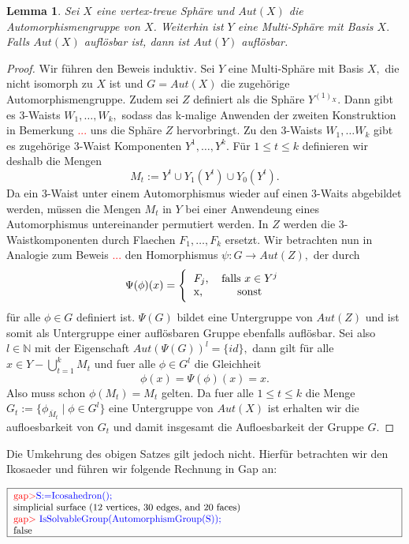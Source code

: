 \documentclass[12pt,titlepage,twoside,cleardoublepage]{article}
\theoremstyle{nummermitklammern}
\newtheorem{lemma}[temp]{Lemma}
\newtheorem{lemma}[zahl]{Lemma}
\numberwithin{equation}{section}
\begin{document}
\begin{lemma}
 Sei $X$ eine vertex-treue Sphäre und $Aut(X)$ die Automorphismengruppe von $X$. Weiterhin ist $Y$ eine Multi-Sphäre mit Basis $X.$ Falls $Aut(X)$ auflösbar ist, dann ist $Aut(Y)$ auflösbar.
\end{lemma}
\begin{proof}
Wir führen den Beweis induktiv. Sei $Y$ eine Multi-Sphäre mit Basis $X,$ die nicht isomorph zu $X$ ist und $G=Aut(X)$ die zugehörige Automorphismengruppe. Zudem sei $Z$ definiert als die Sphäre $Y^{(1)_X}.$ Dann gibt es 3-Waists $W_1,\ldots,W_k,$ sodass das k-malige Anwenden der zweiten Konstruktion in Bemerkung \textcolor{red}{...} uns die Sphäre $Z$ hervorbringt. Zu den 3-Waists $W_1,\ldots W_k$ gibt es zugehörige 3-Waist Komponenten $Y^1,\ldots,Y^k.$  Für $1\leq t\leq k$ definieren wir deshalb die Mengen 
\[
M_t:=Y^t\cup Y_1(Y^t)\cup Y_0(Y^t).
\] Da ein 3-Waist unter einem Automorphismus wieder auf einen 3-Waits abgebildet werden, müssen die Mengen $M_t$ in $Y$ bei einer Anwendeung eines Automorphismus untereinander permutiert werden. In $Z$ werden die 3-Waistkomponenten durch Flaechen $F_1,\ldots,F_k$ ersetzt.
Wir betrachten nun in Analogie zum Beweis \textcolor{red}{...} den Homorphismus $\psi:G\to Aut(Z),$ der durch
\[
\Psi(\phi)(x)=\Biggl\{
\begin{tabular}[l]{lcr}
$F_j$,&\textcolor{black}{ falls  $x\in Y^j$} \\
x,& sonst\\
\end{tabular}
\]
für alle $\phi\in G$ definiert ist.
$\Psi(G)$ bildet eine Untergruppe von $Aut(Z)$ und ist somit als Untergruppe einer auflösbaren Gruppe ebenfalls auflösbar. Sei also $l\in \mathbb{N}$ mit der Eigenschaft $Aut(\Psi(G))^l=\{id\},$ dann gilt für alle $x\in Y-\bigcup_{t=1}^kM_t$ und fuer alle $\phi \in G^l$ die Gleichheit
\[
\phi(x)=\Psi(\phi)(x)=x.
\]
Also muss schon $\phi(M_t)=M_t$ gelten. Da fuer alle $1\leq t\leq k$ die Menge $G_t:=\{\phi_{\bar M_t}\mid \phi\in G^l\}$ eine Untergruppe von $Aut(X)$ ist erhalten wir die aufloesbarkeit von $G_t$ und damit insgesamt die Aufloesbarkeit der Gruppe $G.$
 \end{proof}
Die Umkehrung des obigen Satzes gilt jedoch nicht. Hierfür betrachten wir den Ikosaeder und führen wir folgende Rechnung in Gap an:
\begin{center}
$\fbox{
\parbox{14cm}{
\textcolor{red}{gap$>$}\textcolor{blue}{ S:=Icosahedron();}\newline
simplicial surface (12 vertices, 30 edges, and 20 faces)\newline
\textcolor{red}{gap$>$} \textcolor{blue}{IsSolvableGroup(AutomorphismGroup(S));}\newline
false
}}$
\end{center}
\end{document}
